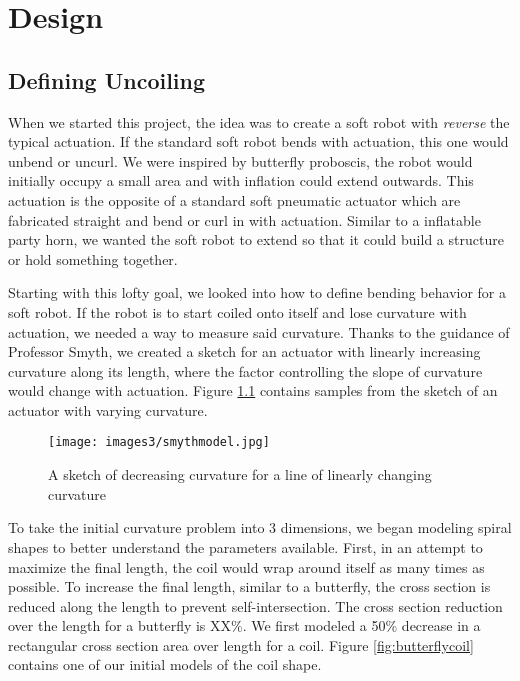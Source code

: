 \chapter{Design}
\section{Defining Uncoiling}

When we started this project, the idea was to create a soft robot with \emph{reverse} the typical actuation. If the standard soft robot bends with actuation, this one would unbend or uncurl. We were inspired by butterfly proboscis, the robot would initially occupy a small area and with inflation could extend outwards. This actuation is the opposite of a standard soft pneumatic actuator which are fabricated straight and bend or curl in with actuation. Similar to a inflatable party horn, we wanted the soft robot to extend so that it could build a structure or hold something together. 

Starting with this lofty goal, we looked into how to define bending behavior for a soft robot. If the robot is to start coiled onto itself and lose curvature with actuation, we needed a way to measure said curvature. Thanks to the guidance of Professor Smyth, we created a sketch for an actuator with linearly increasing curvature along its length, where the factor controlling the slope of curvature would change with actuation. Figure \ref{fig:smythmodel} contains samples from the sketch of an actuator with varying curvature. 

\begin{figure}[ht]
    \centering
    \texttt{[image: images3/smythmodel.jpg]}
    \caption{A sketch of decreasing curvature for a line of linearly changing curvature}
    \label{fig:smythmodel}
\end{figure}

To take the initial curvature problem into 3 dimensions, we began modeling spiral shapes to better understand the parameters available. First, in an attempt to maximize the final length, the coil would wrap around itself as many times as possible. To increase the final length, similar to a butterfly, the cross section is reduced along the length to prevent self-intersection. The cross section reduction over the length for a butterfly is XX\%. We first modeled a 50\% decrease in a rectangular cross section area over length for a coil. Figure \ref{fig:butterflycoil} contains one of our initial models of the coil shape. 

